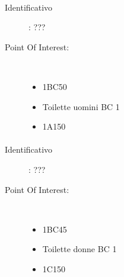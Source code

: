 \documentclass[../SperimentazioniPratiche.tex]{subfiles}
\begin{document}
			\paragraph*{}
			\label{01001}
			\begin{tcolorbox}[fonttitle=\bfseries, 
								adjusted title={\Large Beacon 01001},
								sharp corners=south,
								colback=white, 
								colframe=white!50!blue!75!black]
								
				\begin{description}
					\item[Identificativo]: ???

					\tcbline					
					
					\item[Point Of Interest:] \ \par
					\begin{itemize}
						\item 1BC50
						\item Toilette uomini BC 1
						\item 1A150
					\end{itemize}					   				
				\end{description}  				
			\end{tcolorbox}
			
			\paragraph*{}
			\label{01002}
			\begin{tcolorbox}[fonttitle=\bfseries, 
								adjusted title={\Large Beacon 01002},
								sharp corners=south,
								colback=white, 
								colframe=white!50!blue!75!black]
								
				\begin{description}
					\item[Identificativo]: ???

					\tcbline					
					
					\item[Point Of Interest:] \ \par
					\begin{itemize}
						\item 1BC45
						\item Toilette donne BC 1
						\item 1C150
					\end{itemize}					   				
				\end{description}  				
			\end{tcolorbox}
			
\end{document}
